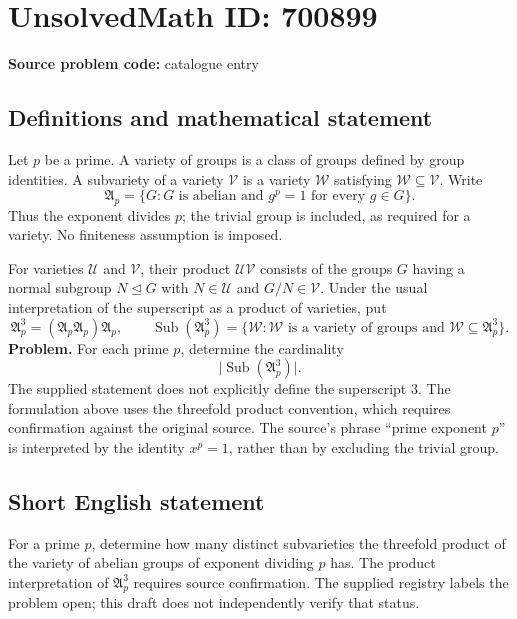 \documentclass[11pt]{article}
\begin{document}
\section*{UnsolvedMath ID: 700899}
\textbf{Source problem code:} catalogue entry
\subsection{Definitions and mathematical statement}
Let \(p\) be a prime. A variety of groups is a class of groups defined by group identities. A subvariety of a variety \(\mathcal V\) is a variety \(\mathcal W\) satisfying \(\mathcal W\subseteq\mathcal V\). Write
\[
\mathfrak A_p=\{G:G\text{ is abelian and }g^p=1\text{ for every }g\in G\}.
\]
Thus the exponent divides \(p\); the trivial group is included, as required for a variety. No finiteness assumption is imposed.

For varieties \(\mathcal U\) and \(\mathcal V\), their product \(\mathcal U\mathcal V\) consists of the groups \(G\) having a normal subgroup \(N\trianglelefteq G\) with \(N\in\mathcal U\) and \(G/N\in\mathcal V\). Under the usual interpretation of the superscript as a product of varieties, put
\[
\mathfrak A_p^3=(\mathfrak A_p\mathfrak A_p)\mathfrak A_p,
\qquad
\operatorname{Sub}(\mathfrak A_p^3)
=\{\mathcal W:\mathcal W\text{ is a variety of groups and }\mathcal W\subseteq\mathfrak A_p^3\}.
\]
\textbf{Problem.} For each prime \(p\), determine the cardinality
\[
\bigl|\operatorname{Sub}(\mathfrak A_p^3)\bigr|.
\]
The supplied statement does not explicitly define the superscript \(3\). The formulation above uses the threefold product convention, which requires confirmation against the original source. The source's phrase ``prime exponent \(p\)'' is interpreted by the identity \(x^p=1\), rather than by excluding the trivial group.
\subsection{Short English statement}
For a prime \(p\), determine how many distinct subvarieties the threefold product of the variety of abelian groups of exponent dividing \(p\) has. The product interpretation of \(\mathfrak A_p^3\) requires source confirmation. The supplied registry labels the problem open; this draft does not independently verify that status.
\end{document}
